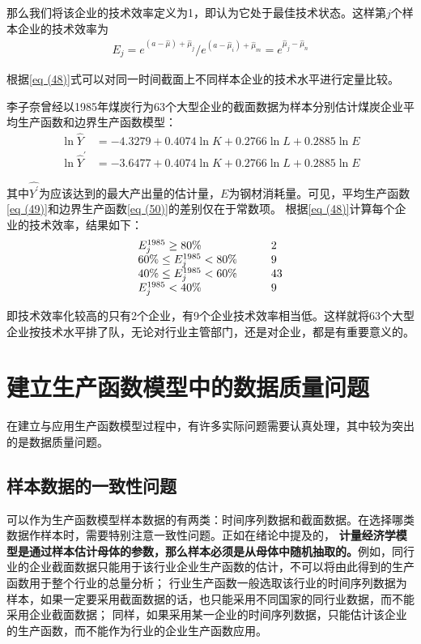 	那么我们将该企业的技术效率定义为1，即认为它处于最佳技术状态。这样第$ j $个样本企业的技术效率为
	\begin{align}
		E_{j}=e^{(a-\hat{\mu})+\hat{\mu}_{j}} / e^{\left(a-\hat{\mu}_{i}\right)+\hat{\mu}_{m}}=e^{\hat{\mu}_{j}-\hat{\mu}_{n}}
		\label{eq (48)}
	\end{align}

	根据\eqref{eq (48)}式可以对同一时间截面上不同样本企业的技术水平进行定量比较。
		
	李子奈曾经以1985年煤炭行为63个大型企业的截面数据为样本分别估计煤炭企业平均生产函数和边界生产函数模型：
	\begin{align}
		\ln \hat{Y} & = -4.3279+0.4074 \ln K+0.2766 \ln L+0.2885 \ln E    
		\label{eq (49)} \\
		\ln \hat{Y}^{\prime} & = -3.6477+0.4074 \ln K+0.2766 \ln L+0.2885 \ln E
		\label{eq (50)}
	\end{align}

	其中$ \hat{Y^{\prime}} $为应该达到的最大产出量的估计量，$ E $为钢材消耗量。可见，平均生产函数\eqref{eq (49)}和边界生产函数\eqref{eq (50)}的差别仅在于常数项。
	根据\eqref{eq (48)}计算每个企业的技术效率，结果如下：
	\begin{equation}
		\begin{array}{ll}
			E_{j}^{1985} \geq 80 \% 		& 	\qquad 	2 \\
			60 \% \leq E_{j}^{1985}<80 \% 	& 	\qquad	9 \\
			40 \% \leq E_{j}^{1985}<60 \% 	& 	\qquad	43 \\
			E_{j}^{1985}<40 \% 				& 	\qquad	9 \notag
		\end{array}
	\end{equation}

	即技术效率化较高的只有2个企业，有9个企业技术效率相当低。这样就将63个大型企业按技术水平排了队，无论对行业主管部门，还是对企业，都是有重要意义的。
	
\section{建立生产函数模型中的数据质量问题} 
在建立与应用生产函数模型过程中，有许多实际问题需要认真处理，其中较为突出的是数据质量问题。
	
\subsection{样本数据的一致性问题} 
	
可以作为生产函数模型样本数据的有两类：时间序列数据和截面数据。在选择哪类数据作样本时，需要特别注意一致性问题。正如在绪论中提及的，
\textbf{计量经济学模型是通过样本估计母体的参数，那么样本必须是从母体中随机抽取的。}例如，同行业的企业截面数据只能用于该行业企业生产函数的估计，不可以将由此得到的生产函数用于整个行业的总量分析；
行业生产函数一般选取该行业的时间序列数据为样本，如果一定要采用截面数据的话，也只能采用不同国家的同行业数据，而不能采用企业截面数据；
同样，如果采用某一企业的时间序列数据，只能估计该企业的生产函数，而不能作为行业的企业生产函数应用。
	
